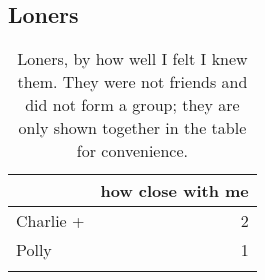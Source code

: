 \pagebreak 

\subsection{Loners}
\nopagebreak
\begin{table}[ht]
\caption{Loners, by how well I felt I knew them.  They were not friends and did not form a group; they are only shown together in the table for convenience.}\label{append:loners}

	\centering
		\begin{tabular}{lr} \\
		\lsptoprule
			\multirow{2}{*}{\sc name} & \multicolumn{1}{p{1.75cm}}{\centering \sc how close with me}  \\
		\midrule
Charlie + & 2 \\\hline
Polly     & 1 \\
   \lspbottomrule
				\end{tabular}
\end{table}


